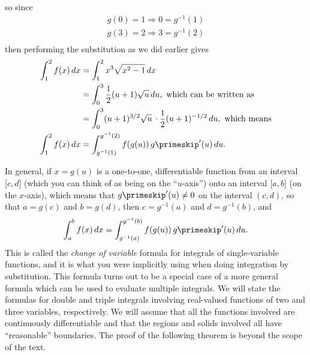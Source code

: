 so since
\begin{align*}
 g(0) = 1 \Rightarrow 0 = g^{-1} (1)\\
 g(3) = 2 \Rightarrow 3 = g^{-1} (2)\\
\end{align*}
then performing the substitution as we did earlier gives
\begin{align*}
 \int_1^2 f(x)\,dx &= \int_1^2 x^3 \sqrt{x^2 - 1}\,dx\\
 &= \int_0^3 \frac12(u+1)\sqrt{u}\,du ,\text{ which can be written as}\\
 &= \int_0^3 (u+1)^{3/2} \sqrt{u} \, \cdot \frac12 (u+1)^{-1/2}\,du ,\text{ which means}\\
 \int_1^2 f(x)\,dx &= \int_{g^{-1}(1)}^{g^{-1}(2)} f(g(u))\,g\primeskip'(u)\,du .
\end{align*}

In general, if $x = g(u)$ is a one-to-one, differentiable function from an interval $\lbrack c,d \rbrack$ (which you can think of as being on the ``$u$-axis'') onto an interval $\lbrack a,b \rbrack$ (on the $x$-axis), which means that $g\primeskip'(u) \ne 0$ on the interval $(c,d)$, so that $a=g(c)$ and $b=g(d)$, then $c=g^{-1}(a)$ and $d=g^{-1}(b)$, and
\[\int_a^b f(x)\,dx = \int_{g^{-1}(a)}^{g^{-1}(b)} f(g(u))\,g\primeskip'(u)\,du .\]
This is called the \emph{change of variable} formula for integrals of single-variable functions, and it is what you were implicitly using when doing integration by substitution. This formula turns out to be a special case of a more general formula which can be used to evaluate multiple integrals. We will state the formulas for double and triple integrals involving real-valued functions of two and three variables, respectively. We will assume that all the functions involved are continuously differentiable and that the regions and solids involved all have ``reasonable'' boundaries. The proof of the following theorem is beyond the scope of the text.%

